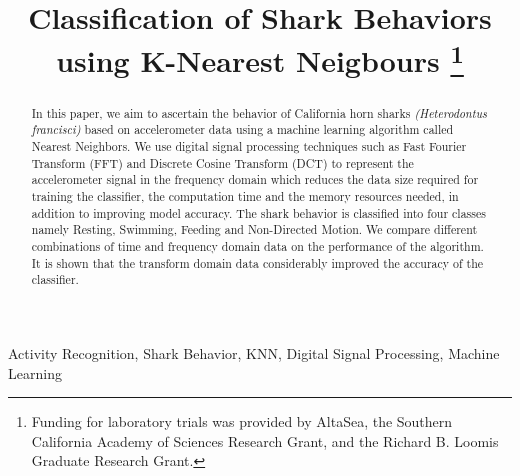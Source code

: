 \documentclass[conference]{IEEEtran}
\begin{document}
\title{Classification of Shark Behaviors using K-Nearest Neigbours \thanks{Funding for laboratory trials was provided by AltaSea, the Southern California Academy of Sciences Research Grant, and the Richard B. Loomis Graduate Research Grant.}
}

\author{
}

\maketitle


\begin{abstract}
In this paper, we aim to ascertain the behavior of California horn sharks \textit{(Heterodontus francisci)} based on accelerometer data using a machine learning algorithm called Nearest Neighbors. We use digital signal processing techniques such as Fast Fourier Transform (FFT) and Discrete Cosine Transform (DCT) to represent the accelerometer signal in the frequency domain which reduces the data size required for training the classifier, the computation time and the memory resources needed, in addition to improving model accuracy. The shark behavior is classified into four classes namely Resting, Swimming, Feeding and Non-Directed Motion. We compare different combinations of time and frequency domain data on the performance of the algorithm. It is shown that the transform domain data considerably improved the accuracy of the classifier.
\end{abstract}

\begin{IEEEkeywords}
Activity Recognition, Shark Behavior, KNN, Digital Signal Processing, Machine Learning
\end{IEEEkeywords}
\end{document}
